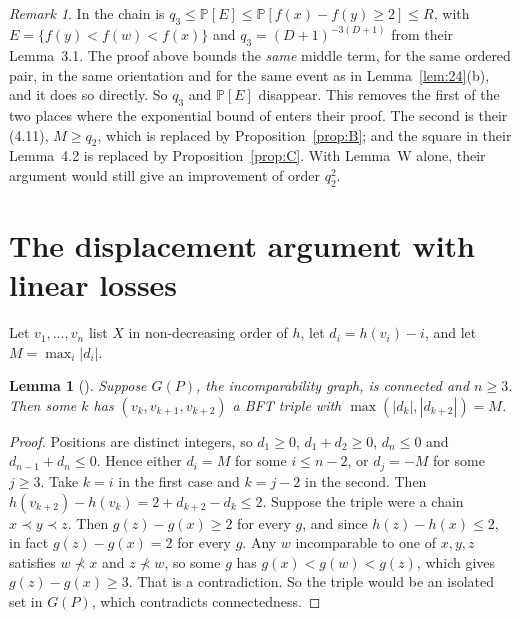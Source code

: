 \documentclass[10pt]{amsart}
\newtheorem{lemma}[theorem]{Lemma}
\theoremstyle{definition}
\theoremstyle{remark}
\newtheorem{remark}[theorem]{Remark}
\newcommand{\PP}{\mathbb{P}}
\begin{document}
\begin{remark}
In \cite[Lemma~3.2(iii)]{KSBFT} the chain is $q_3\le\PP[E]\le\PP[f(x)-f(y)\ge2]\le R$, with $E=\{f(y)<f(w)<f(x)\}$ and $q_3=(D+1)^{-3(D+1)}$ from their Lemma~3.1.
The proof above bounds the \emph{same} middle term, for the same ordered pair, in the same orientation and for the same event as in Lemma~\ref{lem:24}(b), and it does so directly.
So $q_3$ and $\PP[E]$ disappear.
This removes the first of the two places where the exponential bound of \cite[Lemma~3.1]{KSBFT} enters their proof. The second is their (4.11), $M\ge q_2$, which is replaced by Proposition~\ref{prop:B}; and the square in their Lemma~4.2 is replaced by Proposition~\ref{prop:C}.
With Lemma~W alone, their argument would still give an improvement of order $q_2^2$.
\end{remark}

\section{The displacement argument with linear losses}

Let $v_1,\dots,v_n$ list $X$ in non-decreasing order of $h$, let $d_i=h(v_i)-i$, and let $M=\max_i|d_i|$.

\begin{lemma}[{\cite[Lemma~4.1]{KSBFT}}]\label{lem:41}
Suppose $G(P)$, the incomparability graph, is connected and $n\ge3$. Then some $k$ has $(v_k,v_{k+1},v_{k+2})$ a BFT triple with $\max(|d_k|,|d_{k+2}|)=M$.
\end{lemma}
\begin{proof}
Positions are distinct integers, so $d_1\ge0$, $d_1+d_2\ge0$, $d_n\le0$ and $d_{n-1}+d_n\le0$.
Hence either $d_i=M$ for some $i\le n-2$, or $d_j=-M$ for some $j\ge3$. Take $k=i$ in the first case and $k=j-2$ in the second.
Then $h(v_{k+2})-h(v_k)=2+d_{k+2}-d_k\le2$.
Suppose the triple were a chain $x\prec y\prec z$. Then $g(z)-g(x)\ge2$ for every $g$, and since $h(z)-h(x)\le2$, in fact $g(z)-g(x)=2$ for every $g$.
Any $w$ incomparable to one of $x,y,z$ satisfies $w\not\prec x$ and $z\not\prec w$, so some $g$ has $g(x)<g(w)<g(z)$, which gives $g(z)-g(x)\ge 3$. That is a contradiction.
So the triple would be an isolated set in $G(P)$, which contradicts connectedness.
\end{proof}
\end{document}
